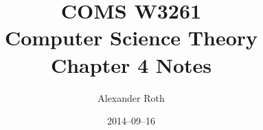\documentclass[]{article}
\begin{document}
\title{COMS W3261 \\ Computer Science Theory \\ Chapter 4 Notes}
\author{Alexander Roth}
\date{2014--09--16}
\maketitle
\newtheorem{thm}{Theorem}
\end{document}
